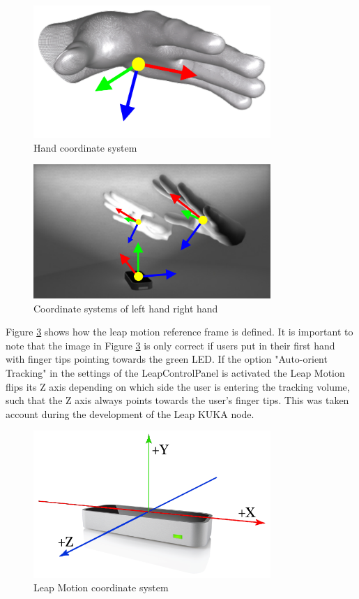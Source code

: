 \documentclass[headsepline,footinclude=false,fontsize=11pt,paper=a4,listof=totoc,bibliography=totoc,BCOR=12mm,DIV=14]{scrbook}
\begin{document}
\begin{figure}[h]
    \centering
    \includegraphics[width=9cm]{images/hand}
    \caption{Hand coordinate system \cite{LeapImages}}
    \label{fig:hand_coosy}
\end{figure}

\begin{figure}[h]
    \centering
    \includegraphics[width=9cm]{images/two_hands}
    \caption{Coordinate systems of left hand right hand \cite{LeapImages}}
    \label{fig:two_hands_coosy}
\end{figure}

Figure \ref{fig:leap_coosy} shows how the leap motion reference frame is defined. It is important to note that the image in Figure \ref{fig:leap_coosy} is only correct if users put in their first hand with finger tips pointing towards the green LED. If the option "Auto-orient Tracking" in the settings of the LeapControlPanel is activated the Leap Motion flips its Z axis depending on which side the user is entering the tracking volume, such that the Z axis always points towards the user's finger tips. This was taken account during the development of the Leap KUKA node.

\begin{figure}[h]
    \centering
    \includegraphics[width=9cm]{images/leap_coosy}
    \caption{Leap Motion coordinate system \cite{LeapImages}}
    \label{fig:leap_coosy}
\end{figure}
\end{document}
